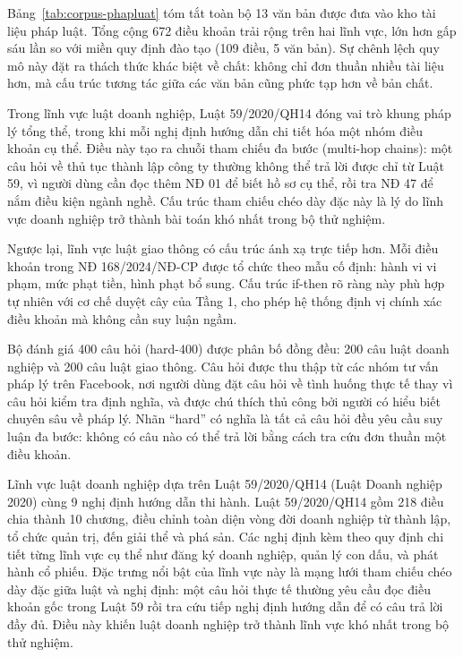 Bảng~\ref{tab:corpus-phapluat} tóm tắt toàn bộ 13 văn bản được đưa vào kho tài liệu
pháp luật. Tổng cộng 672 điều khoản trải rộng trên hai lĩnh vực, lớn hơn gấp sáu lần
so với miền quy định đào tạo (109 điều, 5 văn bản). Sự chênh lệch quy mô này đặt ra
thách thức khác biệt về chất: không chỉ đơn thuần nhiều tài liệu hơn, mà cấu trúc tương
tác giữa các văn bản cũng phức tạp hơn về bản chất.

Trong lĩnh vực luật doanh nghiệp, Luật 59/2020/QH14 đóng vai trò khung pháp lý
tổng thể, trong khi mỗi nghị định hướng dẫn chi tiết hóa một nhóm điều khoản cụ thể.
Điều này tạo ra chuỗi tham chiếu đa bước (multi-hop chains): một câu hỏi về thủ tục
thành lập công ty thường không thể trả lời được chỉ từ Luật 59, vì người dùng cần đọc
thêm NĐ 01 để biết hồ sơ cụ thể, rồi tra NĐ 47 để nắm điều kiện ngành nghề. Cấu trúc
tham chiếu chéo dày đặc này là lý do lĩnh vực doanh nghiệp trở thành bài toán khó nhất
trong bộ thử nghiệm.

Ngược lại, lĩnh vực luật giao thông có cấu trúc ánh xạ trực tiếp hơn. Mỗi điều khoản
trong NĐ 168/2024/NĐ-CP được tổ chức theo mẫu cố định: hành vi vi phạm, mức
phạt tiền, hình phạt bổ sung. Cấu trúc if-then rõ ràng này phù hợp tự nhiên với cơ
chế duyệt cây của Tầng 1, cho phép hệ thống định vị chính xác điều khoản mà không
cần suy luận ngầm.

Bộ đánh giá 400 câu hỏi (hard-400) được phân bố đồng đều: 200 câu luật doanh nghiệp
và 200 câu luật giao thông. Câu hỏi được thu thập từ các nhóm tư vấn pháp lý trên
Facebook, nơi người dùng đặt câu hỏi về tình huống thực tế thay vì câu hỏi
kiểm tra định nghĩa, và được chú thích thủ công bởi người có hiểu biết chuyên sâu về
pháp lý. Nhãn ``hard'' có nghĩa là tất cả câu hỏi đều yêu cầu suy luận đa bước: không
có câu nào có thể trả lời bằng cách tra cứu đơn thuần một điều khoản.

Lĩnh vực luật doanh nghiệp dựa trên Luật 59/2020/QH14 (Luật Doanh nghiệp 2020)
cùng 9 nghị định hướng dẫn thi hành. Luật 59/2020/QH14 gồm 218 điều chia thành 10
chương, điều chỉnh toàn diện vòng đời doanh nghiệp từ thành lập, tổ chức quản trị, đến
giải thể và phá sản. Các nghị định kèm theo quy định chi tiết từng lĩnh vực cụ thể như
đăng ký doanh nghiệp, quản lý con dấu, và phát hành cổ phiếu. Đặc trưng nổi bật của
lĩnh vực này là mạng lưới tham chiếu chéo dày đặc giữa luật và nghị định: một câu hỏi
thực tế thường yêu cầu đọc điều khoản gốc trong Luật 59 rồi tra cứu tiếp nghị định
hướng dẫn để có câu trả lời đầy đủ. Điều này khiến luật doanh nghiệp trở thành lĩnh
vực khó nhất trong bộ thử nghiệm.


